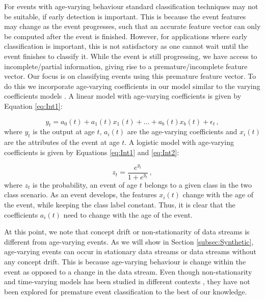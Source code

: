 \documentclass[11pt]{article}
\begin{document}
	For events with age-varying behaviour standard classification techniques may not be suitable, if early detection is important. This is because the event features may change as the event progresses, such that an accurate feature vector can only be computed after the event is finished. However, for applications where early classification is important, this is not satisfactory as one cannot wait until the event  finishes to classify it.  While the event is still progressing, we have access to incomplete/partial information,  giving rise to a premature/incomplete feature vector. Our focus is on classifying events using this premature feature vector.  To do this we incorporate age-varying coefficients in our model similar to the varying coefficients models \cite{hastie1993varying}. A linear model with age-varying coefficients is given by Equation \eqref{eq:Int1}:
	
	\begin{equation}\label{eq:Int1}
	y_t = a_0(t)  + a_1(t) x_1(t) + \ldots + a_b(t)x_b(t) + \epsilon_t \, , 
	\end{equation} 
	\noindent
	where $y_t$ is the output at age $t$, $a_i(t)$ are the age-varying coefficients and $x_i(t)$ are the attributes of the event at age $t$. A logistic model with age-varying coefficients is given by Equations \eqref{eq:Int1} and  \eqref{eq:Int2}:
	
	\begin{equation}\label{eq:Int2}
	z_t = \frac{e^{y_t}}{1 + e^{y_t}} \, ,
	\end{equation} 
	\noindent
	where $z_t$ is the probability, an event of age $t$ belongs to a given class in the two class scenario. As an event develops, the features $x_i(t)$ change with the age of the event, while keeping the class label constant. Thus, it is clear that the coefficients $a_i(t)$ need to change with the age of the event. 

	At this point, we note that concept drift \cite{widmer1996learning, tsymbal2004problem,klinkenberg2000detecting,gama2014survey} or non-stationarity of data streams \cite{hulten2001mining, gama2010knowledge, gaber2005mining} is different from  age-varying events. As we will show in Section \ref{subsec:Synthetic}, age-varying events can occur in stationary data streams or data streams without any concept drift. This is because age-varying behaviour is change within the event as opposed to a change in the data stream. Even though non-stationarity and time-varying models has been studied in different contexts \cite{harvey1989time, wang1998cluster, hoover1998nonparametric}, they have not been explored for premature event classification to the best of our knowledge. 
	
\end{document}
